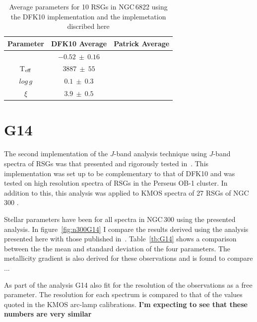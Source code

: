 \begin{table}
\caption[Parameter comparisons DFK10]{Average parameters for 10 RSGs in NGC\,6822 using the DFK10 implementation and the implemetation discribed here\label{tb:DFK10}}
\scriptsize
\begin{center}
\begin{tabular}{ccc}
 \hline
 \hline
Parameter & DFK10 Average & Patrick Average \\
 \hline
[Z]       & $-0.52~\pm~0.16$ &  \\
T$_{\rm eff}$ & $3887~\pm~55$ &  \\
$log\,g$  & $0.1~\pm~0.3$ &  \\
$\xi$     & $3.9~\pm~0.5$ &  \\
 \hline
\end{tabular}
\end{center}
\end{table}

\section{G14} %
\label{sub:g14}
The second implementation of the $J$-band analysis technique using $J$-band spectra of RSGs was that presented and rigorously tested in~\cite{2014PhDT.........G}.
This implementation was set up to be complementary to that of DFK10 and was tested on high resolution spectra of RSGs in the Perseus OB-1 cluster.
In addition to this, this analysis was applied to KMOS spectra of 27 RSGs of NGC\,300
\citep{2015ApJ...805..182G}.

Stellar parameters have been for all spectra in NGC\,300 using the presented analysis.
In figure~\ref{fig:n300G14} I compare the results derived using the analysis presented here with those published in~\citep{2015ApJ...805..182G}.
Table~\ref{tb:G14} shows a comparison between the the mean and standard deviation of the four parameters.
The metallicity gradient is also derived for these observations and is found to compare ...

As part of the analysis G14 also fit for the resolution of the observations as a free parameter.
The resolution for each spectrum is compared to that of the values quoted in the KMOS arc-lamp calibrations.
\textbf{I'm expecting to see that these numbers are very similar}


